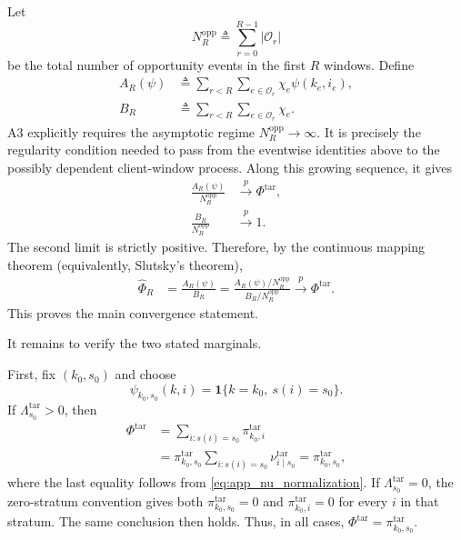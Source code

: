 Let
\begin{equation}
    N_R^{\mathrm{opp}}
    \triangleq
    \sum_{r=0}^{R-1}|\mathcal{O}_r|
    \label{eq:app_total_opp_events}
\end{equation}
be the total number of opportunity events in the first $R$ windows.  Define
\begin{align}
 A_R(\psi)
 &\triangleq
 \sum_{r<R}
 \sum_{e\in\mathcal{O}_r}
 \chi_e\psi(k_e,i_e),
 \label{eq:app_AR}\\
 B_R
 &\triangleq
 \sum_{r<R}
 \sum_{e\in\mathcal{O}_r}
 \chi_e.
 \label{eq:app_BR}
\end{align}
A3 explicitly requires the asymptotic regime
$N_R^{\mathrm{opp}}\rightarrow\infty$.  It is precisely the regularity
condition needed to pass from the eventwise identities above to the possibly
dependent client-window process.  Along this growing sequence, it gives
\begin{align}
 \frac{A_R(\psi)}{N_R^{\mathrm{opp}}}
 &\xrightarrow{p}
 \Phi^{\mathrm{tar}},
 \label{eq:app_AR_lln}\\
 \frac{B_R}{N_R^{\mathrm{opp}}}
 &\xrightarrow{p}
 1.
 \label{eq:app_BR_lln}
\end{align}
The second limit is strictly positive.  Therefore, by the continuous mapping
theorem (equivalently, Slutsky's theorem),
\begin{align}
 \widehat\Phi_R
 &=
 \frac{A_R(\psi)}{B_R}
 =
 \frac{
 A_R(\psi)/N_R^{\mathrm{opp}}
 }{
 B_R/N_R^{\mathrm{opp}}
 }
 \xrightarrow{p}
 \Phi^{\mathrm{tar}}.
 \label{eq:app_hajek_limit}
\end{align}
This proves the main convergence statement.

It remains to verify the two stated marginals.

First, fix $(k_0,s_0)$ and choose
\begin{equation}
    \psi_{k_0,s_0}(k,i)
    =
    \mathbf{1}\{k=k_0,\ s(i)=s_0\}.
    \label{eq:app_phi_client_stratum}
\end{equation}
If $\Lambda_{s_0}^{\mathrm{tar}}>0$, then
\begin{align}
 \Phi^{\mathrm{tar}}
 &=
 \sum_{i:s(i)=s_0}
 \pi^{\mathrm{tar}}_{k_0,i}
 \nonumber\\
 &=
 \pi^{\mathrm{tar}}_{k_0,s_0}
 \sum_{i:s(i)=s_0}
 \nu^{\mathrm{tar}}_{i\mid s_0}
 =
 \pi^{\mathrm{tar}}_{k_0,s_0},
 \label{eq:app_recover_client_stratum_positive}
\end{align}
where the last equality follows from
\eqref{eq:app_nu_normalization}.  If
$\Lambda_{s_0}^{\mathrm{tar}}=0$, the zero-stratum convention gives both
$\pi^{\mathrm{tar}}_{k_0,s_0}=0$ and
$\pi^{\mathrm{tar}}_{k_0,i}=0$ for every $i$ in that stratum.  The same
conclusion then holds.  Thus, in all cases,
$\Phi^{\mathrm{tar}}=\pi^{\mathrm{tar}}_{k_0,s_0}$.


